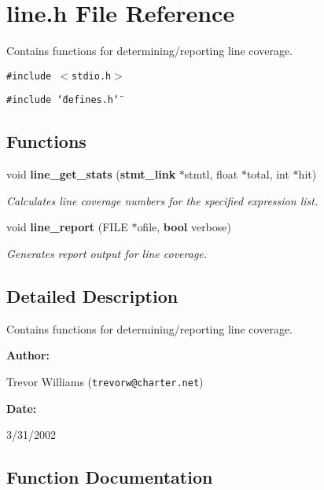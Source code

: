 \section{line.h File Reference}
\label{line_8h}
Contains functions for determining/reporting line coverage. 


{\tt \#include $<$stdio.h$>$}\par
{\tt \#include \char`\"{}defines.h\char`\"{}}\par
\subsection*{Functions}
\begin{CompactItemize}
\item 
void {\bf line\_\-get\_\-stats} ({\bf stmt\_\-link} $\ast$stmtl, float $\ast$total, int $\ast$hit)
\begin{CompactList}\small\item\em Calculates line coverage numbers for the specified expression list.\item\end{CompactList}\item 
void {\bf line\_\-report} (FILE $\ast$ofile, {\bf bool} verbose)
\begin{CompactList}\small\item\em Generates report output for line coverage.\item\end{CompactList}\end{CompactItemize}


\subsection{Detailed Description}
Contains functions for determining/reporting line coverage.



\begin{Desc}
\item[{\bf Author: }]\par
Trevor Williams ({\tt trevorw@charter.net}) \end{Desc}
\begin{Desc}
\item[{\bf Date: }]\par
3/31/2002

\end{Desc}


\subsection{Function Documentation}
